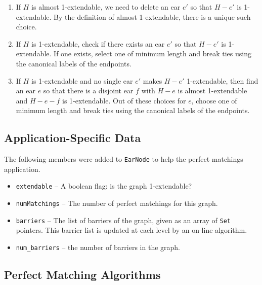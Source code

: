 \documentclass[11pt]{article}
\begin{document}
\begin{itemize}
		\begin{enumerate}
			\item If $H$ is almost 1-extendable, 
				we need to delete an ear $e'$ so that $H - e'$ is 1-extendable.
				By the definition of almost 1-extendable, there is a unique such choice.
				
			\item If $H$ is 1-extendable, 
				check if there exists an ear $e'$ so that $H - e'$ is 1-extendable.
				If one exists, select one of minimum length and break ties
					using the canonical labels of the endpoints.
					
			\item If $H$ is 1-extendable and 
					no single ear $e'$ makes $H - e'$ 1-extendable, then
					find an ear $e$ so that there is a disjoint ear $f$ 
					with $H-e$ is almost 1-extendable
					and
					$H - e - f$ is 1-extendable.
					Out of these choices for $e$, choose one of 
						minimum length and break ties
					using the canonical labels of the endpoints.
		\end{enumerate}
\end{itemize}

\subsection{Application-Specific Data}

The following members were added to \texttt{EarNode} 
	to help the perfect matchings application.

\begin{itemize}

	\item \texttt{extendable} -- A boolean flag: is the graph 1-extendable?

	\item  \texttt{numMatchings} -- The number of perfect matchings for this graph.

	\item  \texttt{barriers} -- The list of barriers of the graph, given as an array of \texttt{Set}
		pointers.  This barrier list is updated at each level by an
		 on-line algorithm. 

	\item  \texttt{num\_barriers} -- the number of barriers in the graph.

\end{itemize}

\subsection{Perfect Matching Algorithms}
\end{document}
